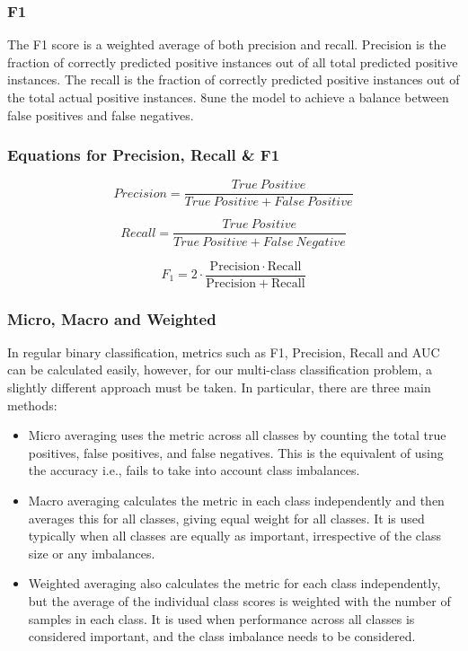 \subsubsection*{F1}

The F1 score is a weighted average of both precision and recall. Precision is the fraction of correctly predicted positive instances out of all total predicted positive instances. The recall is the fraction of correctly predicted positive instances out of the total actual positive instances.
8une the model to achieve a balance between false positives and false negatives.

\subsubsection*{Equations for Precision, Recall \& F1} 

\begin{equation*} Precision = \frac{True\ Positive}{True\ Positive + False\ Positive} \end{equation*}

\begin{equation*} Recall = \frac{True\ Positive}{True\ Positive + False\ Negative} \end{equation*}

\begin{equation*}
F_1 = 2 \cdot \frac{\mathrm{Precision} \cdot \mathrm{Recall}}{\mathrm{Precision} + \mathrm{Recall}}
\end{equation*}

\subsubsection*{Micro, Macro and Weighted}

In regular binary classification, metrics such as F1, Precision, Recall and AUC can be calculated easily, however, for our multi-class classification problem, a slightly different approach must be taken. In particular, there are three main methods:

\begin{itemize}
    \item Micro averaging uses the metric across all classes by counting the total true positives, false positives, and false negatives. This is the equivalent of using the accuracy i.e., fails to take into account class imbalances.
    \item Macro averaging calculates the metric in each class independently and then averages this for all classes, giving equal weight for all classes. It is used typically when all classes are equally as important, irrespective of the class size or any imbalances.
    \item Weighted averaging also calculates the metric for each class independently, but the average of the individual class scores is weighted with the number of samples in each class. It is used when performance across all classes is considered important, and the class imbalance needs to be considered.
\end{itemize}


